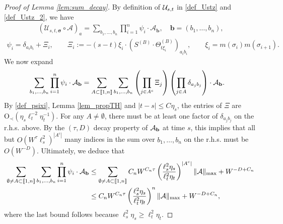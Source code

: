 \begin{proof}[Proof of Lemma \ref{lem:sum_decay}]
By definition of ${\cal U}_{s, t}$ in \eqref{def_Ustz} and \eqref{def_Ustz_2}, we have 
\begin{align}
      \left(\mathcal{U}_{s, t, \boldsymbol{\sigma}} \circ \mathcal{A}\right)_a=\sum_{b_1, \ldots, b_n} \prod_{i=1}^n\psi_i  \cdot \mathcal{A}_{\boldsymbol{b}}, \quad \boldsymbol{b}=\left(b_1, \ldots, b_n\right),
\end{align}
\begin{align}\label{def_psixi}
     \psi_i=\delta_{a_ib_i}+\Xi_i,  \quad \quad 
\Xi_i:=-(s-t)\xi_i \cdot \left(S^{(B)}\cdot \Theta^{(B)}_{t \xi_i}\right)_{a_ib_i},\quad\quad \xi_i=m(\sigma_i)m(\sigma_{i+1}).
 \end{align} 
We now expand
%
\begin{align*}
\sum_{b_{1},\ldots,b_{n}}\prod_{i=1}^{n}\psi_{i}\cdot{\cal A}_{\textbf{b}}&=\sum_{ A\subset\llbracket1,n\rrbracket}\sum_{b_{1},\ldots,b_{n}}\left(\prod_{j\in A^{c}}\Xi_{j}\right)\left(\prod_{j\in A}\delta_{a_{j}b_{j}}\right)\cdot{\cal A}_{\textbf{b}}.    
\end{align*}
By \eqref{def_psixi}, Lemma \ref{lem_propTH} and $|t-s|\leq C\eta_{s}$, the entries of $\Xi$ are $\mathrm{O}_{\prec}(\eta_{s}\ell_{t}^{-2}\eta_{t}^{-1})$. For any $A\neq\emptyset$, there must be at least one factor of $\delta_{a_{j}b_{j}}$ on the r.h.s. above. By the $(\tau,D)$ decay property of ${\cal A}_{\textbf{b}}$ at time $s$, this implies that all but $O(W^{\tau}\ell_{s}^{2})^{|A^{c}|}$ many indices in the sum over $b_{1},\ldots,b_{n}$ on the r.h.s. must be $O(W^{-D})$. Ultimately, we deduce that 
%
\begin{align}\label{iukwjn-d=2}
\sum_{\emptyset\neq A\subset\llbracket1,n\rrbracket}\sum_{b_{1},\ldots,b_{n}}\prod_{i=1}^{n}\psi_{i}\cdot{\cal A}_{\textbf{b}}&\leq\sum_{\emptyset\neq A\subset\llbracket1,n\rrbracket} C_{n}W^{C_{n}\tau}\left(\frac{\ell_{s}^{2}\eta_{s}}{\ell_{t}^{2}\eta_{t}}\right)^{|A^{c}|}\|{\cal A}\|_{\max}+W^{-D+C_{n}}\nonumber\\
&\leq C_{n}W^{C_{n}\tau}\left(\frac{\ell_{s}^{2}\eta_{s}}{\ell_{t}^{2}\eta_{t}}\right)^{n}\|{\cal A}\|_{\max}+W^{-D+C_{n}},
\end{align}
%
where the last bound follows because $\ell_{s}^{2}\eta_{s}\geq\ell_{t}^{2}\eta_{t}$.


\end{proof}
